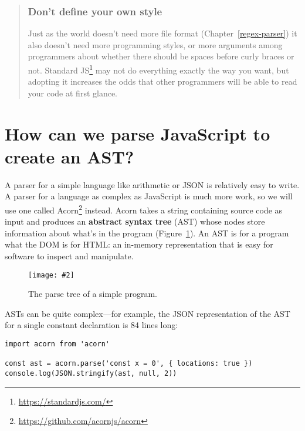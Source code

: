 \documentclass[krantzl]{krantz}
\newcommand{\figpdf}[4]{\begin{figure}%
\centering%
\texttt{[image: \#2]}%
\caption{#3}%
\label{#1}%
\end{figure}}
\newcommand{\chapref}[1]{Chapter~\ref{#1}}
\newcommand{\figref}[1]{Figure~\ref{#1}}
\newcommand{\glossref}[1]{\textbf{#1}}
\newenvironment{callout}{\savenotes\begin{tBox}\begin{quotation}\toggletrue{inbox}\renewcommand{\thempfootnote}{\arabic{footnote}}}{\end{quotation}\vspace{\baselineskip}\end{tBox}\togglefalse{inbox}\spewnotes}
\newcommand{\hreffoot}[2]{{#1}\footnote{\href{#2}{#2}}}
\begin{document}
\begin{callout}


\subsubsection*{Don't define your own style}


Just as the world doesn't need more file format (\chapref{regex-parser})
it also doesn't need more programming styles,
or more arguments among programmers about whether there should be spaces before curly braces or not.
\hreffoot{Standard JS}{https://standardjs.com/} may not do everything exactly the way you want,
but adopting it increases the odds that other programmers will be able to read your code at first glance.

\end{callout}

\section{How can we parse JavaScript to create an AST?}\label{style-checker-ast}


A parser for a simple language like arithmetic or JSON is relatively easy to write.
A parser for a language as complex as JavaScript is much more work,
so we will use one called \hreffoot{Acorn}{https://github.com/acornjs/acorn} instead.
Acorn takes a string containing source code as input
and produces an \glossref{abstract syntax tree} (AST)
whose nodes store information about what's in the program
(\figref{style-checker-parse-tree}).
An AST is for a program what the DOM is for HTML:
an in-memory representation that is easy for software to inspect and manipulate.

\figpdf{style-checker-parse-tree}{./style-checker/parse-tree.pdf}{The parse tree of a simple program.}{0.6}


ASTs can be quite complex---for example,
the JSON representation of the AST for a single constant declaration
is 84 lines long:


\begin{lstlisting}[frame=single,frameround=tttt]
import acorn from 'acorn'

const ast = acorn.parse('const x = 0', { locations: true })
console.log(JSON.stringify(ast, null, 2))
\end{lstlisting}
\end{document}
